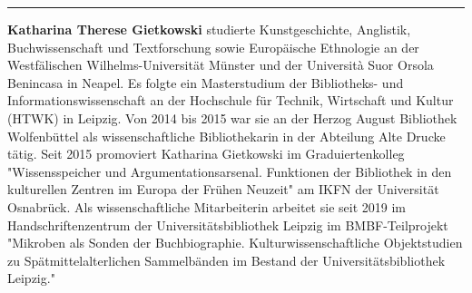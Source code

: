 \begin{center}\rule{0.5\linewidth}{0.5pt}\end{center}

\textbf{Katharina Therese Gietkowski} studierte Kunstgeschichte,
Anglistik, Buchwissenschaft und Textforschung sowie Europäische
Ethnologie an der Westfälischen Wilhelms-Universität Münster und der
Università Suor Orsola Benincasa in Neapel. Es folgte ein Masterstudium
der Bibliotheks- und Informationswissenschaft an der Hochschule für
Technik, Wirtschaft und Kultur (HTWK) in Leipzig. Von 2014 bis 2015 war
sie an der Herzog August Bibliothek Wolfenbüttel als wissenschaftliche
Bibliothekarin in der Abteilung Alte Drucke tätig. Seit 2015 promoviert
Katharina Gietkowski im Graduiertenkolleg "Wissensspeicher und
Argumentationsarsenal. Funktionen der Bibliothek in den kulturellen
Zentren im Europa der Frühen Neuzeit" am IKFN der Universität
Osnabrück. Als wissenschaftliche Mitarbeiterin arbeitet sie seit 2019 im
Handschriftenzentrum der Universitätsbibliothek Leipzig im
BMBF-Teilprojekt "Mikroben als Sonden der
Buchbiographie. Kulturwissenschaftliche Objektstudien zu
Spätmittelalterlichen Sammelbänden im Bestand der Universitätsbibliothek
Leipzig."
